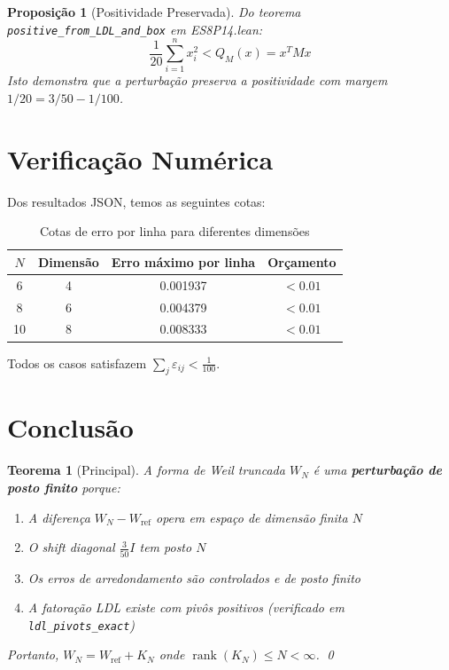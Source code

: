\documentclass[12pt,a4paper]{article}
\theoremstyle{plain}
\newtheorem{teorema}{Teorema}
\newtheorem{proposicao}{Proposição}
\theoremstyle{definition}
\theoremstyle{remark}
\begin{document}
\begin{proposicao}[Positividade Preservada]
Do teorema \texttt{positive\_from\_LDL\_and\_box} em ES8P14.lean:
\begin{equation}
\frac{1}{20}\sum_{i=1}^n x_i^2 < Q_M(x) = x^T M x
\end{equation}
Isto demonstra que a perturbação preserva a positividade com margem $1/20 = 3/50 - 1/100$.
\end{proposicao}

\section{Verificação Numérica}

Dos resultados JSON, temos as seguintes cotas:

\begin{table}[h]
\centering
\caption{Cotas de erro por linha para diferentes dimensões}
\label{tab:cotas}
\begin{tabular}{cccc}
\toprule
$N$ & Dimensão & Erro máximo por linha & Orçamento \\
\midrule
6  & 4 & 0.001937 & $< 0.01$ \\
8  & 6 & 0.004379 & $< 0.01$ \\
10 & 8 & 0.008333 & $< 0.01$ \\
\bottomrule
\end{tabular}
\end{table}

Todos os casos satisfazem $\sum_j \varepsilon_{ij} < \frac{1}{100}$.

\section{Conclusão}

\begin{teorema}[Principal]
A forma de Weil truncada $W_N$ é uma \textbf{perturbação de posto finito} porque:
\begin{enumerate}
    \item[$\checkmark$] A diferença $W_N - W_{\text{ref}}$ opera em espaço de dimensão finita $N$
    \item[$\checkmark$] O shift diagonal $\frac{3}{50}I$ tem posto $N$
    \item[$\checkmark$] Os erros de arredondamento são controlados e de posto finito
    \item[$\checkmark$] A fatoração LDL existe com pivôs positivos (verificado em \texttt{ldl\_pivots\_exact})
\end{enumerate}

Portanto, $W_N = W_{\text{ref}} + K_N$ onde $\operatorname{rank}(K_N) \leq N < \infty$. \qed
\end{teorema}
\end{document}
